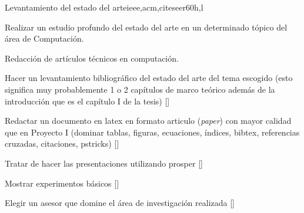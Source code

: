 \begin{syllabus}
\begin{unit}{Levantamiento del estado del arte}{}{ieee,acm,citeseer}{60}{h,l}
  \begin{topics}
      \item Realizar un estudio profundo del estado del arte en un determinado tópico del área de Computación.
      \item Redacción de artículos técnicos en computación.
  \end{topics}
  \begin{learningoutcomes}
      \item Hacer un levantamiento bibliográfico del estado del arte del tema escogido (esto significa muy probablemente 1 o 2 capítulos de marco teórico además de la introducción que es el capítulo I de la tesis) [\Usage]
      \item Redactar un documento en latex en formato articulo (\emph{paper}) con mayor calidad que en Proyecto I (dominar tablas, figuras, ecuaciones, índices, bibtex, referencias cruzadas, citaciones, pstricks) [\Usage]
      \item Tratar de hacer las presentaciones utilizando prosper [\Usage]
      \item Mostrar experimentos básicos [\Usage]
      \item Elegir un asesor que domine el área de investigación realizada [\Usage]
   \end{learningoutcomes}
\end{unit}

\begin{coursebibliography}
\end{coursebibliography}

\end{syllabus}

